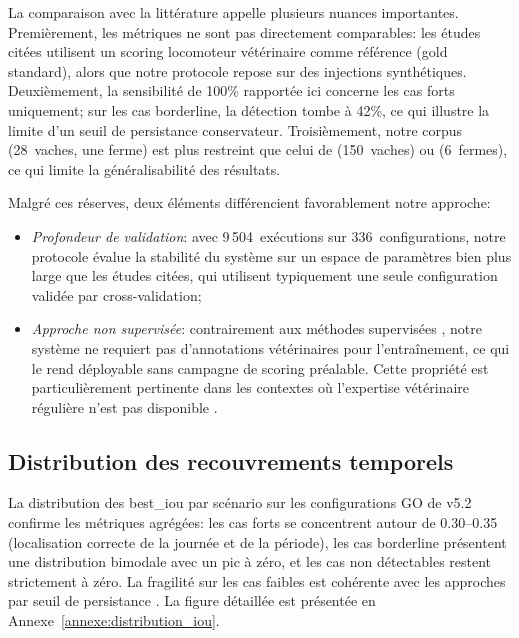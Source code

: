 La comparaison avec la littérature appelle plusieurs nuances importantes. Premièrement, les métriques ne sont
pas directement comparables: les études citées utilisent un scoring locomoteur vétérinaire
comme référence (gold standard), alors que notre protocole repose sur des injections
synthétiques. Deuxièmement, la sensibilité de 100\% rapportée ici concerne les cas forts
uniquement; sur les cas borderline, la détection tombe à 42\%, ce qui illustre la limite
d'un seuil de persistance conservateur. Troisièmement, notre corpus (28~vaches, une ferme)
est plus restreint que celui de \cite{beer2016objective} (150~vaches) ou
\cite{lavrova2023lameness} (6~fermes), ce qui limite la généralisabilité des résultats.

Malgré ces réserves, deux éléments différencient favorablement notre approche:
\begin{itemize}
    \item \textit{Profondeur de validation}: avec 9\,504~exécutions sur 336~configurations, notre
    protocole évalue la stabilité du système sur un espace de paramètres bien plus large que
    les études citées, qui utilisent typiquement une seule configuration validée par
    cross-validation;
    \item \textit{Approche non supervisée}: contrairement aux méthodes supervisées
    \citep{chapinal2010measurement,beer2016objective,lavrova2023lameness}, notre système ne
    requiert pas d'annotations vétérinaires pour l'entraînement, ce qui le rend déployable sans
    campagne de scoring préalable. Cette propriété est particulièrement pertinente dans les
    contextes où l'expertise vétérinaire régulière n'est pas disponible
    \citep{rutten2013invited}.
\end{itemize}

\FloatBarrier
\subsection{Distribution des recouvrements temporels}

La distribution des best\_iou par scénario sur les configurations GO de v5.2 confirme
les métriques agrégées: les cas forts se concentrent autour de 0.30--0.35 (localisation
correcte de la journée et de la période), les cas borderline présentent une distribution
bimodale avec un pic à zéro, et les cas non détectables restent strictement à zéro. La
fragilité sur les cas faibles est cohérente avec les approches par seuil de persistance
\citep{alsaaod2019automatic}. La figure détaillée est présentée en
Annexe~\ref{annexe:distribution_iou}.

